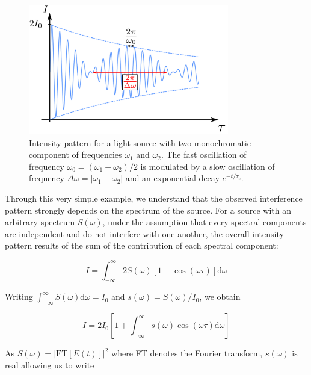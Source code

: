 \begin{figure}
    \centering
    \includegraphics[width=0.78\textwidth]{Fig/Chapter1/michelson_two_lambda.png}
    \caption[Intensity pattern for a light source with two monochromatic component of frequencies $\omega_1$ and $\omega_2$]{Intensity pattern for a light source with two monochromatic component of frequencies $\omega_1$ and $\omega_2$. The fast oscillation of frequency $\omega_0=(\omega_1+\omega_2)/2$ is modulated by a slow oscillation of frequency $\Delta \omega = |\omega_1 - \omega_2|$ and an exponential decay $e^{-t/\tau_c}$.}
    \label{fig:michelson_two_lambda}
\end{figure}

Through this very simple example, we understand that the observed interference pattern strongly depends on the spectrum of the source. For a source with an arbitrary spectrum $S(\omega)$, under the assumption that every spectral components are independent and do not interfere with one another, the overall intensity pattern results of the sum of the contribution of each spectral component:

\begin{equation}
    I=\int_{-\infty}^{\infty} 2 S(\omega)[1+\cos (\omega \tau)] \mathrm{d} \omega
\end{equation}

\noindent Writing $\int_{-\infty}^{\infty} S(\omega) \mathrm{d} \omega=I_{0}$ and $s(\omega)=S(\omega) / I_{0}$, we obtain

\begin{equation}
    I=2 I_{0}\left[1+\int_{-\infty}^{\infty} s(\omega) \cos (\omega \tau) \mathrm{d} \omega\right]
\end{equation}

\noindent As $S(\omega) = |\mathrm{FT}[E(t)]|^2$ where FT denotes the Fourier transform, $s(\omega)$ is real allowing us to write \cite{mandel1995optical} 

